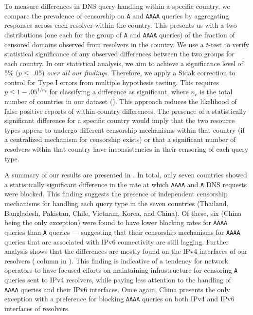 To measure differences in DNS query handling within a specific country, we
compare the prevalence of censorship on {\tt A} and {\tt AAAA} queries by
aggregating responses across {each resolver within the country}. This presents
us with a two distributions (one each for the group of {\tt A} and {\tt AAAA}
queries) of the fraction of censored domains observed from resolvers in the
country.
%
We use a $t$-test to verify statistical significance of any observed
differences between the two groups for each country. In our statistical
analysis, we aim to achieve a significance level of 5\% ($p \leq$  .05)
\emph{over all our findings}. Therefore, we apply a Sidak correction
\cite{abdi2007bonferroni} to control for Type I errors from multiple hypothesis
testing. 
%
This requires $p \leq 1-{.05}^{1/n_{c}}$ for classifying a difference as
significant, where $n_c$ is the total number of countries in our dataset
(). This approach reduces the likelihood of false-positive reports
of within-country differences.
%
The presence of a statistically significant difference for a specific country
would imply that the two resource types appear to undergo different censorship
mechanisms within that country (if a centralized mechanism for censorship
exists) or that a significant number of resolvers within that country have
inconsistencies in their censoring of each query type.

A summary of our results are presented in . In
total, only seven countries showed a statistically significant difference in
the rate at which {\tt AAAA} and {\tt A} DNS requests were blocked. 
%
This finding suggests the presence of independent censorship mechanisms for
handling each query type in the seven countries (Thailand, Bangladesh,
Pakistan, Chile, Vietnam, Korea, and China).
%
Of these, six (China being the only exception) were found to have lower
blocking rates for {\tt AAAA} queries than {\tt A} queries --- suggesting that
their censorship mechanisms for {\tt AAAA} queries that are associated with
IPv6 connectivity are still lagging. 
%
Further analysis shows that the differences are mostly found on the IPv4
interfaces of our resolvers ( column in
). 
%
This finding is indicative of a tendency for network operators to have
focused efforts on maintaining infrastructure for censoring {\tt A} queries
sent to IPv4 resolvers, while paying less attention to the handling of {\tt
AAAA} queries and their IPv6 interfaces.
%
Once again, China presents the only exception with a preference for blocking
{\tt AAAA} queries on both IPv4 and IPv6 interfaces of resolvers.

